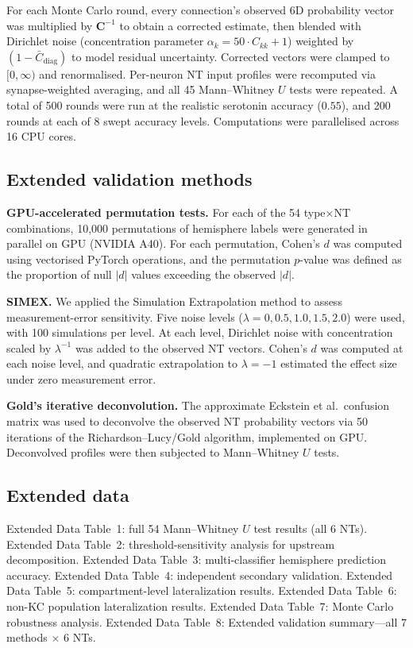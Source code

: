 \documentclass[10pt]{article}
\begin{document}
For each Monte Carlo round, every connection's observed 6D probability vector was multiplied by $\mathbf{C}^{-1}$ to obtain a corrected estimate, then blended with Dirichlet noise (concentration parameter $\alpha_k = 50 \cdot C_{kk} + 1$) weighted by $(1 - \bar{C}_{\mathrm{diag}})$ to model residual uncertainty. Corrected vectors were clamped to $[0, \infty)$ and renormalised. Per-neuron NT input profiles were recomputed via synapse-weighted averaging, and all 45 Mann--Whitney $U$ tests were repeated. A total of 500 rounds were run at the realistic serotonin accuracy ($0.55$), and 200 rounds at each of 8 swept accuracy levels. Computations were parallelised across 16 CPU cores.

\subsection*{Extended validation methods}
\textbf{GPU-accelerated permutation tests.} For each of the 54 type$\times$NT combinations, 10,000 permutations of hemisphere labels were generated in parallel on GPU (NVIDIA A40). For each permutation, Cohen's $d$ was computed using vectorised PyTorch operations, and the permutation $p$-value was defined as the proportion of null $|d|$ values exceeding the observed $|d|$.

\textbf{SIMEX.} We applied the Simulation Extrapolation method to assess measurement-error sensitivity. Five noise levels ($\lambda = 0, 0.5, 1.0, 1.5, 2.0$) were used, with 100 simulations per level. At each level, Dirichlet noise with concentration scaled by $\lambda^{-1}$ was added to the observed NT vectors. Cohen's $d$ was computed at each noise level, and quadratic extrapolation to $\lambda = -1$ estimated the effect size under zero measurement error.

\textbf{Gold's iterative deconvolution.} The approximate Eckstein et al.\ confusion matrix was used to deconvolve the observed NT probability vectors via 50 iterations of the Richardson--Lucy/Gold algorithm, implemented on GPU. Deconvolved profiles were then subjected to Mann--Whitney $U$ tests.

\subsection*{Extended data}
Extended Data Table~1: full 54 Mann--Whitney $U$ test results (all 6 NTs). Extended Data Table~2: threshold-sensitivity analysis for upstream decomposition. Extended Data Table~3: multi-classifier hemisphere prediction accuracy. Extended Data Table~4: independent secondary validation. Extended Data Table~5: compartment-level lateralization results. Extended Data Table~6: non-KC population lateralization results. Extended Data Table~7: Monte Carlo robustness analysis. Extended Data Table~8: Extended validation summary---all 7 methods $\times$ 6 NTs.
\end{document}
